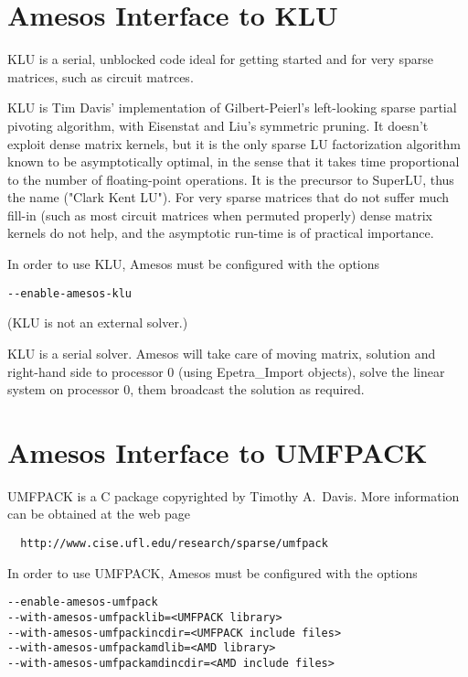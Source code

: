 \documentclass[11pt]{SANDreport}
\begin{document}

\section{Amesos Interface to KLU}
\label{sec:klu}

KLU is a serial, unblocked code ideal for getting started and for very
sparse matrices, such as circuit matrces.

KLU is Tim Davis' implementation of Gilbert-Peierl's left-looking sparse
partial pivoting algorithm, with Eisenstat and Liu's symmetric pruning.
It doesn't exploit dense matrix kernels, but it is the only sparse LU
factorization algorithm known to be asymptotically optimal, in the sense
that it takes time proportional to the number of floating-point
operations. It is the precursor to SuperLU, thus the name ("Clark Kent
LU"). For very sparse matrices that do not suffer much fill-in (such as
most circuit matrices when permuted properly) dense matrix kernels do
not help, and the asymptotic run-time is of practical importance.

\smallskip

In order to use KLU, Amesos must be configured with the options
\begin{verbatim}
--enable-amesos-klu
\end{verbatim}
(KLU is not an external solver.)

KLU is a serial solver. Amesos will take care of moving matrix,
solution and right-hand side to processor 0 (using Epetra\_Import
objects), solve the linear system on processor 0, them broadcast the
solution as required.


\section{Amesos Interface to UMFPACK}
\label{sec:umfpack}

UMFPACK is a C package copyrighted by Timothy A.~Davis. More information
can be obtained at the web page
\begin{verbatim}
  http://www.cise.ufl.edu/research/sparse/umfpack
\end{verbatim}

In order to use UMFPACK, Amesos must be configured with the options
\begin{verbatim}
--enable-amesos-umfpack 
--with-amesos-umfpacklib=<UMFPACK library> 
--with-amesos-umfpackincdir=<UMFPACK include files>
--with-amesos-umfpackamdlib=<AMD library>
--with-amesos-umfpackamdincdir=<AMD include files>
\end{verbatim}
\end{document}
